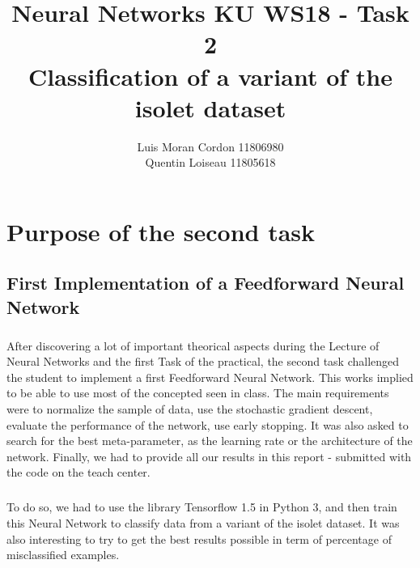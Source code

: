 \documentclass[a4paper]{report}
\title{Neural Networks KU WS18 - Task 2 \\ Classification of a variant of the isolet dataset}
\author{Luis Moran Cordon 11806980 \\ Quentin Loiseau 11805618}
\begin{document}
\maketitle

\pagestyle{fancy}
\fancyhead[R]{}

\chapter{Purpose of the second task}

\section{First Implementation of a Feedforward Neural Network}
\paragraph{} After discovering a lot of important theorical aspects during the Lecture of Neural Networks and the first Task of the practical, the second task challenged the student to implement a first Feedforward Neural Network.
This works implied to be able to use most of the concepted seen in class. The main requirements were to normalize the sample of data, use the stochastic gradient descent, evaluate the performance of the network, use early stopping. It was also asked to search for the best meta-parameter, as the learning rate or the architecture of the network. Finally, we had to provide all our results in this report - submitted with the code on the teach center.
\paragraph{} To do so, we had to use the library Tensorflow 1.5 in Python 3, and then train this Neural Network to classify data from a variant of the isolet dataset. It was also interesting to try to get the best results possible in term of percentage of misclassified examples.
\end{document}

